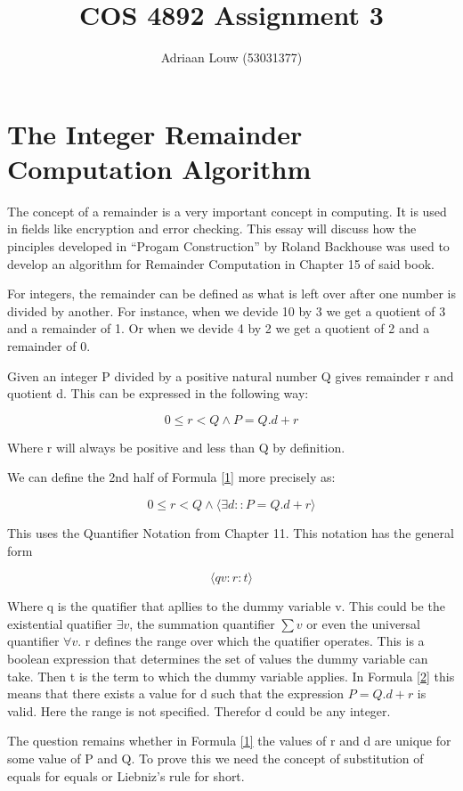 \documentclass[10pt,a4paper]{article}
\title{COS 4892 Assignment 3}
\author{Adriaan Louw (53031377)}
\begin{document}
\maketitle

\section{The Integer Remainder Computation Algorithm}

The concept of a remainder is a very important concept in computing. It is used in fields like encryption and error checking. This essay will discuss how the pinciples developed in ``Progam Construction'' by Roland Backhouse was used to develop an algorithm for Remainder Computation in Chapter 15 of said book.

For integers, the remainder can be defined as what is left over after one number is divided by another. For instance, when we devide 10 by 3 we get a quotient of 3 and a remainder of 1. Or when we devide 4 by 2 we get a quotient of 2 and a remainder of 0. 

Given an integer P divided by a positive natural number Q gives remainder r and quotient d. This can be expressed in the following way:

\begin{equation}
\label{1}
 0\le r < Q \wedge P = Q.d +r
\end{equation}

Where r will always be positive and less than Q by definition.

We can define the 2nd half of Formula \ref{1} more precisely as:

\begin{equation}
\label{2}
 0\le r < Q \wedge \langle \exists d::P = Q.d +r\rangle 
\end{equation}

This uses the Quantifier Notation from Chapter 11. This notation has the general form 

\begin{equation}
 \langle q v :r:t \rangle
\end{equation}

Where q is the quatifier that apllies to the dummy variable v. This could be the existential quatifier $\exists v$, the summation quantifier $\sum v$ or even the universal quantifier $\forall v$. r defines the range over which the quatifier operates. This is a boolean expression that determines the set of values the dummy variable  can take. Then t is the term to which the dummy variable applies. In Formula \ref{2} this means that there exists a value for d such that the expression $P = Q.d + r$ is valid. Here the range is not specified. Therefor d could be any integer.

The question remains whether in Formula \ref{1} the values of r and d are unique for some value of P and Q. To prove this we need the concept of substitution of equals for equals or Liebniz's rule for short.
\end{document}
